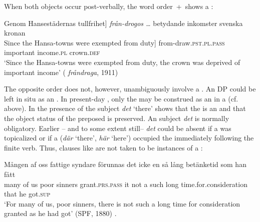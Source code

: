\documentclass[output=paper]{langscibook}
\begin{document}
When both objects occur post-verbally, the word order \,+\, shows a :

\ea%
    \label{ex:falk:10}
            {\ob}Genom Hansestädernas tullfrihet]               \textit{från-drogos …} betydande   inkomster  svenska    kronan \\
    {\ob}Since the Hansa-towns were exempted from duty]   from-draw\textsc{.pst.pl}.\textsc{pass}    important   income\textsc{.pl}     crown.\textsc{def}\\
\glt ‘Since the Hansa-towns were exempted from duty, the  crown was deprived of important income’ ( \textit{fråndraga}, 1911)
\z


The opposite order does not, however, unambiguously involve a . An  DP could be left in situ as an . In present-day , only the  may be construed as an  in a  (cf.  above). In  the presence of {the  subject \textit{det} ‘there’} shows that the  is an  and that the object status of the preposed  is preserved. An  subject \textit{det} is normally obligatory. Earlier – and to some extent still– \textit{det} could be absent if a  was topicalized or if a   (\textit{där} ‘there’, \textit{här} ‘here’) occupied the  immediately following the finite verb. Thus, clauses like  are not taken to be instances of a :

\ea%
    \label{ex:falk:11}
\ea\label{ex:falk:11a}
\gll Mången  af  oss  fattige  syndare  förunnas      det  icke  en  så    lång  betänketid            som  han  fått\\
many    of  us    poor    sinners    grant\textsc{.prs}.\textsc{pass}     it    not  a  such  long      time.for.consideration  that  he    got\textsc{.sup}\footnotemark{}\\
\glt ‘For many of us, poor sinners, there is not such a long time for consideration granted as he had got’ (SPF, 1880)
.
\end{document}
